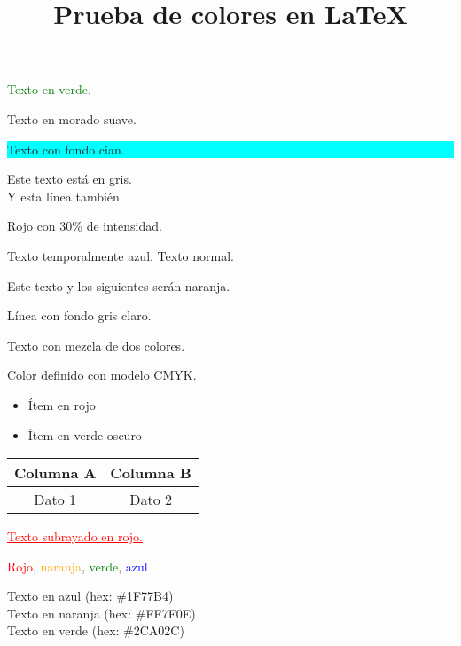 \documentclass[12pt]{article}
\title{Prueba de colores en LaTeX}
\author{}
\date{}
\begin{document}
\maketitle

\textcolor{green}{Texto en verde.}

\textcolor{moradoSuave}{Texto en morado suave.}

\colorbox{cyan}{\strut Texto con fondo cian.}


{\color{gray}
Este texto está en gris.\\
Y esta línea también.}

\textcolor{rojoClaro}{Rojo con 30\% de intensidad.}

{\color{blue} Texto temporalmente azul.} Texto normal.

\color{orange}
Este texto y los siguientes serán naranja.

\colorbox{grisFondo}{\strut Línea con fondo gris claro.}

\vspace{1cm}

\textcolor{mezclaFinal}{Texto con mezcla de dos colores.}

\textcolor{colorCMYK}{Color definido con modelo CMYK.}

\begin{itemize}
  \item {\color{red} Ítem en rojo}
  \item {\color{green!60!black} Ítem en verde oscuro}
\end{itemize}

\begin{tabular}{|c|c|}
\hline
\rowcolor{gray!20} Columna A & Columna B \\
\hline
\cellcolor{yellow!30} Dato 1 & \cellcolor{blue!10} Dato 2 \\
\hline
\end{tabular}

\newcommand{\subrayadoColor}[2]{\textcolor{#1}{\underline{#2}}}
\subrayadoColor{red}{Texto subrayado en rojo.}

\textcolor{red}{Rojo}, \textcolor{orange}{naranja}, \textcolor{green}{verde}, \textcolor{blue}{azul}

\vspace{1cm}


\textcolor{hexAzul}{Texto en azul (hex: \#1F77B4)}\\
\textcolor{hexNaranja}{Texto en naranja (hex: \#FF7F0E)}\\
\textcolor{hexVerde}{Texto en verde (hex: \#2CA02C)}
\end{document}
